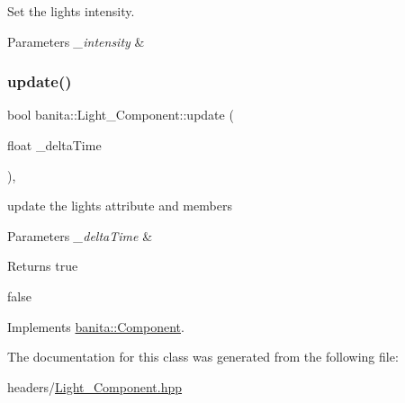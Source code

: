 Set the light\textquotesingle{}s intensity. 


\begin{DoxyParams}{Parameters}
{\em \+\_\+intensity} & \\
\hline
\end{DoxyParams}
\mbox{\label{classbanita_1_1_light___component_a1cba9ef2cb6b798623899ad94f68df9f}} 
\subsubsection{\texorpdfstring{update()}{update()}}
{\footnotesize\ttfamily bool banita\+::\+Light\+\_\+\+Component\+::update (\begin{DoxyParamCaption}\item[{float}]{\+\_\+delta\+Time }\end{DoxyParamCaption})\hspace{0.3cm}{\ttfamily [override]}, {\ttfamily [virtual]}}



update the light\textquotesingle{}s attribute and members 


\begin{DoxyParams}{Parameters}
{\em \+\_\+delta\+Time} & \\
\hline
\end{DoxyParams}
\begin{DoxyReturn}{Returns}
true 

false 
\end{DoxyReturn}


Implements \mbox{\hyperlink{classbanita_1_1_component_ae8f9d11dc8e3c920d6d40146668c429b}{banita\+::\+Component}}.



The documentation for this class was generated from the following file\+:\begin{DoxyCompactItemize}
\item 
headers/\mbox{\hyperlink{_light___component_8hpp}{Light\+\_\+\+Component.\+hpp}}\end{DoxyCompactItemize}
